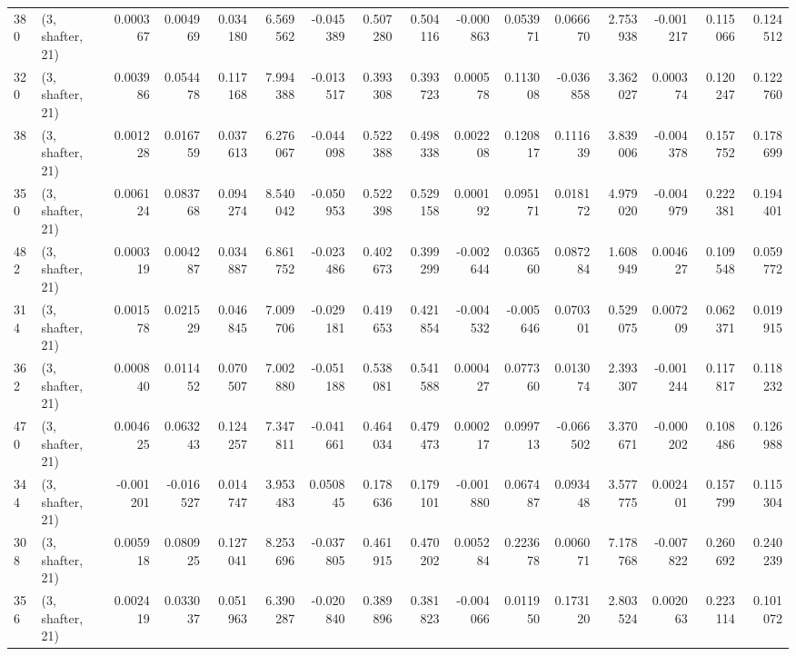 \begin{tabular}{llrrrrrrrrrrrrrr}
380 &  (3, shafter, 21) &   0.000367 &  0.004969 &  0.034180 &    6.569562 & -0.045389 &   0.507280 &  0.504116 & -0.000863 &  0.053971 &  0.066670 &    2.753938 & -0.001217 &  0.115066 &  0.124512 \\
320 &  (3, shafter, 21) &   0.003986 &  0.054478 &  0.117168 &    7.994388 & -0.013517 &   0.393308 &  0.393723 &  0.000578 &  0.113008 & -0.036858 &    3.362027 &  0.000374 &  0.120247 &  0.122760 \\
38  &  (3, shafter, 21) &   0.001228 &  0.016759 &  0.037613 &    6.276067 & -0.044098 &   0.522388 &  0.498338 &  0.002208 &  0.120817 &  0.111639 &    3.839006 & -0.004378 &  0.157752 &  0.178699 \\
350 &  (3, shafter, 21) &   0.006124 &  0.083768 &  0.094274 &    8.540042 & -0.050953 &   0.522398 &  0.529158 &  0.000192 &  0.095171 &  0.018172 &    4.979020 & -0.004979 &  0.222381 &  0.194401 \\
482 &  (3, shafter, 21) &   0.000319 &  0.004287 &  0.034887 &    6.861752 & -0.023486 &   0.402673 &  0.399299 & -0.002644 &  0.036560 &  0.087284 &    1.608949 &  0.004627 &  0.109548 &  0.059772 \\
314 &  (3, shafter, 21) &   0.001578 &  0.021529 &  0.046845 &    7.009706 & -0.029181 &   0.419653 &  0.421854 & -0.004532 & -0.005646 &  0.070301 &    0.529075 &  0.007209 &  0.062371 &  0.019915 \\
362 &  (3, shafter, 21) &   0.000840 &  0.011452 &  0.070507 &    7.002880 & -0.051188 &   0.538081 &  0.541588 &  0.000427 &  0.077360 &  0.013074 &    2.393307 & -0.001244 &  0.117817 &  0.118232 \\
470 &  (3, shafter, 21) &   0.004625 &  0.063243 &  0.124257 &    7.347811 & -0.041661 &   0.464034 &  0.479473 &  0.000217 &  0.099713 & -0.066502 &    3.370671 & -0.000202 &  0.108486 &  0.126988 \\
344 &  (3, shafter, 21) &  -0.001201 & -0.016527 &  0.014747 &    3.953483 &  0.050845 &   0.178636 &  0.179101 & -0.001880 &  0.067487 &  0.093448 &    3.577775 &  0.002401 &  0.157799 &  0.115304 \\
308 &  (3, shafter, 21) &   0.005918 &  0.080925 &  0.127041 &    8.253696 & -0.037805 &   0.461915 &  0.470202 &  0.005284 &  0.223678 &  0.006071 &    7.178768 & -0.007822 &  0.260692 &  0.240239 \\
356 &  (3, shafter, 21) &   0.002419 &  0.033037 &  0.051963 &    6.390287 & -0.020840 &   0.389896 &  0.381823 & -0.004066 &  0.011950 &  0.173120 &    2.803524 &  0.002063 &  0.223114 &  0.101072 \\

\end{tabular}
